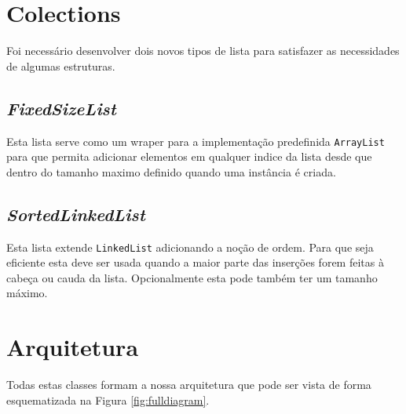 \documentclass[10pt,a4paper]{report}
\begin{document}
    \section{Colections}
    Foi necessário desenvolver dois novos tipos de lista para satisfazer as
    necessidades de algumas estruturas.

        \subsection{\textit{FixedSizeList}}
        Esta lista serve como um wraper para a implementação predefinida
        \texttt{ArrayList} para que permita adicionar elementos
        em qualquer indice da lista desde que dentro do tamanho maximo definido
        quando uma instância é criada.

        \subsection{\textit{SortedLinkedList}}
        Esta lista extende \texttt{LinkedList} adicionando a noção de
        ordem. Para que seja eficiente esta deve ser usada quando a maior parte
        das inserções forem feitas à cabeça ou cauda da lista. Opcionalmente esta
        pode também ter um tamanho máximo.

    \section{Arquitetura}
    Todas estas classes formam a nossa arquitetura que pode ser vista de forma
    esquematizada na Figura \ref{fig:fulldiagram}.
\end{document}

